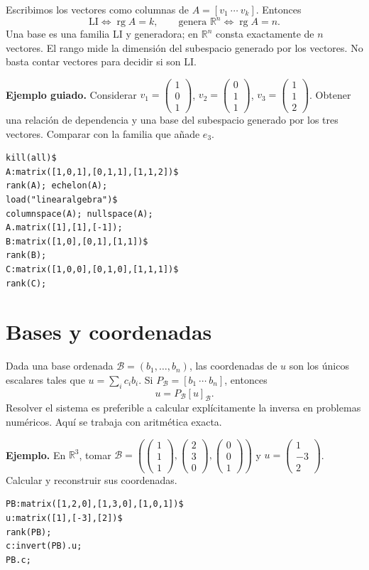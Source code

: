 \documentclass[12pt,a4paper]{article}
\begin{document}
Escribimos los vectores como columnas de $A=[v_1\ \cdots\ v_k]$. Entonces
\[\boxed{\text{LI}\iff\operatorname{rg}A=k,\qquad \text{genera }\mathbb R^n\iff\operatorname{rg}A=n.}\]
Una base es una familia LI y generadora; en $\mathbb R^n$ consta exactamente de $n$ vectores. El rango mide la dimensión del subespacio generado por los vectores. No basta contar vectores para decidir si son LI.

\textbf{Ejemplo guiado.} Considerar $v_1=\begin{pmatrix}1\\0\\1\end{pmatrix}$, $v_2=\begin{pmatrix}0\\1\\1\end{pmatrix}$, $v_3=\begin{pmatrix}1\\1\\2\end{pmatrix}$. Obtener una relación de dependencia y una base del subespacio generado por los tres vectores. Comparar con la familia que añade $e_3$.
\begin{lstlisting}
kill(all)$
A:matrix([1,0,1],[0,1,1],[1,1,2])$
rank(A); echelon(A);
load("linearalgebra")$
columnspace(A); nullspace(A);
A.matrix([1],[1],[-1]);
B:matrix([1,0],[0,1],[1,1])$
rank(B);
C:matrix([1,0,0],[0,1,0],[1,1,1])$
rank(C);
\end{lstlisting}
\section{Bases y coordenadas}
Dada una base ordenada $\mathcal B=(b_1,\ldots,b_n)$, las coordenadas de $u$ son los únicos escalares tales que $u=\sum_i c_i b_i$. Si $P_{\mathcal B}=[b_1\ \cdots\ b_n]$, entonces
\[\boxed{u=P_{\mathcal B}[u]_{\mathcal B}.}\]
Resolver el sistema es preferible a calcular explícitamente la inversa en problemas numéricos. Aquí se trabaja con aritmética exacta.

\textbf{Ejemplo.} En $\mathbb R^3$, tomar $\mathcal B=(\begin{pmatrix}1\\1\\1\end{pmatrix},\begin{pmatrix}2\\3\\0\end{pmatrix},\begin{pmatrix}0\\0\\1\end{pmatrix})$ y $u=\begin{pmatrix}1\\-3\\2\end{pmatrix}$. Calcular y reconstruir sus coordenadas.
\begin{lstlisting}
PB:matrix([1,2,0],[1,3,0],[1,0,1])$
u:matrix([1],[-3],[2])$
rank(PB);
c:invert(PB).u;
PB.c;
\end{lstlisting}
\end{document}
